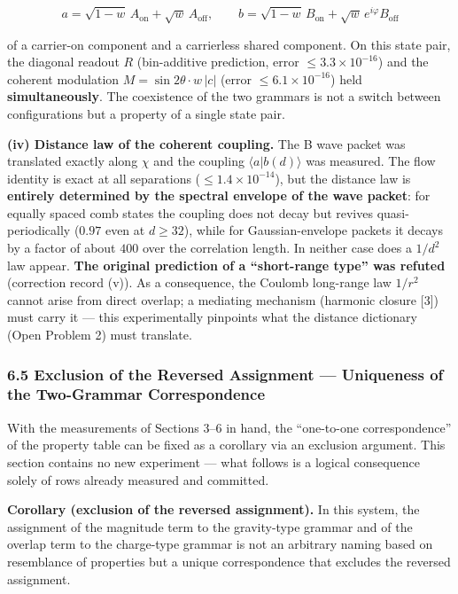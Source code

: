 \documentclass[
  a4paper,
]{article}
\begin{document}
\[
a=\sqrt{1-w}\,A_{\mathrm{on}}+\sqrt{w}\,A_{\mathrm{off}},\qquad
b=\sqrt{1-w}\,B_{\mathrm{on}}+\sqrt{w}\,e^{i\varphi}B_{\mathrm{off}}
\]

of a carrier-on component and a carrierless shared component. On this
state pair, the diagonal readout \(R\) (bin-additive prediction, error
\(\le3.3\times10^{-16}\)) and the coherent modulation
\(M=\sin2\theta\cdot w\,|c|\) (error \(\le6.1\times10^{-16}\)) held
\textbf{simultaneously}. The coexistence of the two grammars is not a
switch between configurations but a property of a single state pair.

\textbf{(iv) Distance law of the coherent coupling.} The B wave packet
was translated exactly along \(\chi\) and the coupling
\(\langle a|b(d)\rangle\) was measured. The flow identity is exact at
all separations (\(\le1.4\times10^{-14}\)), but the distance law is
\textbf{entirely determined by the spectral envelope of the wave
packet}: for equally spaced comb states the coupling does not decay but
revives quasi-periodically (\(0.97\) even at \(d\ge32\)), while for
Gaussian-envelope packets it decays by a factor of about \(400\) over
the correlation length. In neither case does a \(1/d^2\) law appear.
\textbf{The original prediction of a ``short-range type'' was refuted}
(correction record (v)). As a consequence, the Coulomb long-range law
\(1/r^2\) cannot arise from direct overlap; a mediating mechanism
(harmonic closure {[}3{]}) must carry it --- this experimentally
pinpoints what the distance dictionary (Open Problem 2) must translate.

\subsubsection{6.5 Exclusion of the Reversed Assignment --- Uniqueness
of the Two-Grammar
Correspondence}\label{exclusion-of-the-reversed-assignment-uniqueness-of-the-two-grammar-correspondence}

With the measurements of Sections 3--6 in hand, the ``one-to-one
correspondence'' of the property table can be fixed as a corollary via
an exclusion argument. This section contains no new experiment --- what
follows is a logical consequence solely of rows already measured and
committed.

\textbf{Corollary (exclusion of the reversed assignment).} In this
system, the assignment of the magnitude term to the gravity-type grammar
and of the overlap term to the charge-type grammar is not an arbitrary
naming based on resemblance of properties but a unique correspondence
that excludes the reversed assignment.
\end{document}
